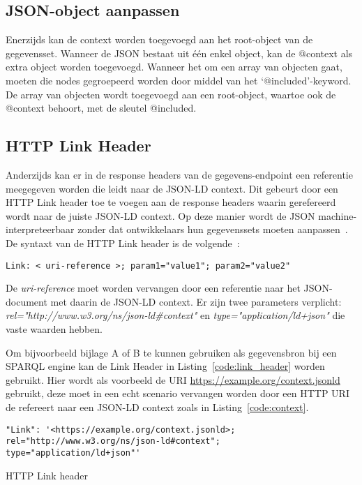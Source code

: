 \subsection{JSON-object aanpassen}
Enerzijds kan de context worden toegevoegd aan het root-object van de gegevensset.
Wanneer de JSON bestaat uit één enkel object, kan de @context als extra object worden toegevoegd. Wanneer het om een array van objecten gaat, moeten die nodes gegroepeerd worden door middel van het `@included'-keyword. De array van objecten wordt toegevoegd aan een root-object, waartoe ook de @context behoort, met de sleutel @included.

\subsection{HTTP Link Header}
Anderzijds kan er in de response headers van de gegevens-endpoint een referentie meegegeven worden die leidt naar de JSON-LD context. Dit gebeurt door een HTTP Link header toe te voegen aan de response headers waarin gerefereerd wordt naar de juiste JSON-LD context.
Op deze manier wordt de JSON machine-interpreteerbaar zonder dat ontwikkelaars hun gegevenssets moeten aanpassen~\cite{JSON-LD1.1}.
De syntaxt van de HTTP Link header is de volgende~\cite{httplinkheader}:
\begin{code}
\begin{verbatim}
Link: < uri-reference >; param1="value1"; param2="value2"
\end{verbatim}
\end{code}
De \textit{uri-reference} moet worden vervangen door een referentie naar het JSON-document met daarin de JSON-LD context. Er zijn twee parameters verplicht: \textit{rel="http://www.w3.org/ns/json-ld\#context"} en \textit{type="application/ld+json"} die vaste waarden hebben. 

Om bijvoorbeeld bijlage A of B te kunnen gebruiken als gegevensbron bij een SPARQL engine kan de Link Header in Listing~\ref{code:link_header} worden gebruikt. Hier wordt als voorbeeld de URI \url{https://example.org/context.jsonld} gebruikt, deze moet in een echt scenario vervangen worden door een HTTP URI de refereert naar een JSON-LD context zoals in Listing~\ref{code:context}.
\begin{code}
\begin{verbatim}
"Link": '<https://example.org/context.jsonld>; rel="http://www.w3.org/ns/json-ld#context"; type="application/ld+json"'
\end{verbatim}
\caption{HTTP Link header}
\label{code:link_header}
\end{code}

